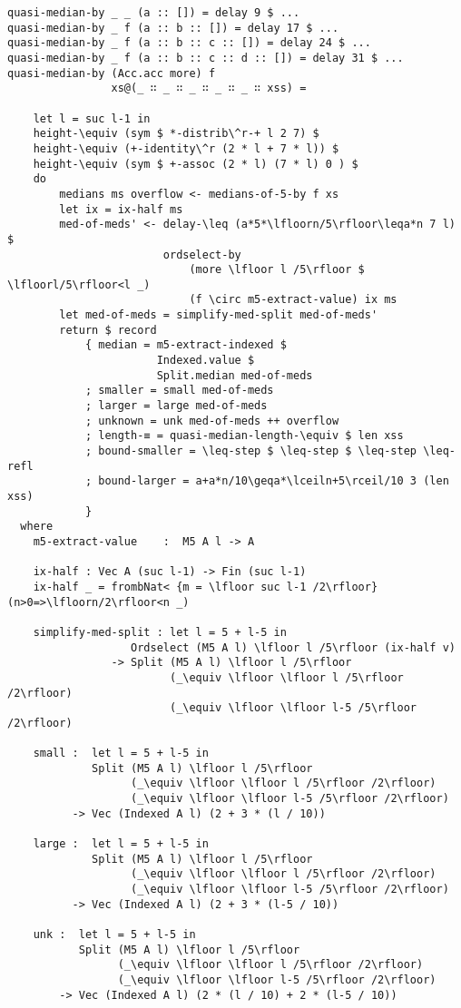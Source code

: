 \begin{lstlisting}[caption={Quasi-Median},label={lst:median:quasimedian}]
quasi-median-by _ _ (a :: []) = delay 9 $ ...
quasi-median-by _ f (a :: b :: []) = delay 17 $ ...
quasi-median-by _ f (a :: b :: c :: []) = delay 24 $ ...
quasi-median-by _ f (a :: b :: c :: d :: []) = delay 31 $ ...
quasi-median-by (Acc.acc more) f
                xs@(_ ∷ _ ∷ _ ∷ _ ∷ _ ∷ xss) =

    let l = suc l-1 in
    height-\equiv (sym $ *-distrib\^r-+ l 2 7) $
    height-\equiv (+-identity\^r (2 * l + 7 * l)) $
    height-\equiv (sym $ +-assoc (2 * l) (7 * l) 0 ) $
    do
        medians ms overflow <- medians-of-5-by f xs
        let ix = ix-half ms
        med-of-meds' <- delay-\leq (a*5*\lfloorn/5\rfloor\leqa*n 7 l) $
                        ordselect-by
                            (more \lfloor l /5\rfloor $ \lfloorl/5\rfloor<l _)
                            (f \circ m5-extract-value) ix ms
        let med-of-meds = simplify-med-split med-of-meds'
        return $ record
            { median = m5-extract-indexed $
                       Indexed.value $
                       Split.median med-of-meds
            ; smaller = small med-of-meds
            ; larger = large med-of-meds
            ; unknown = unk med-of-meds ++ overflow
            ; length-≡ = quasi-median-length-\equiv $ len xss
            ; bound-smaller = \leq-step $ \leq-step $ \leq-step \leq-refl
            ; bound-larger = a+a*n/10\geqa*\lceiln+5\rceil/10 3 (len xss)
            }
  where
    m5-extract-value    :  M5 A l -> A

    ix-half : Vec A (suc l-1) -> Fin (suc l-1)
    ix-half _ = frombNat< {m = \lfloor suc l-1 /2\rfloor} (n>0=>\lfloorn/2\rfloor<n _)

    simplify-med-split : let l = 5 + l-5 in
                   Ordselect (M5 A l) \lfloor l /5\rfloor (ix-half v)
                -> Split (M5 A l) \lfloor l /5\rfloor
                         (_\equiv \lfloor \lfloor l /5\rfloor /2\rfloor)
                         (_\equiv \lfloor \lfloor l-5 /5\rfloor /2\rfloor)

    small :  let l = 5 + l-5 in
             Split (M5 A l) \lfloor l /5\rfloor
                   (_\equiv \lfloor \lfloor l /5\rfloor /2\rfloor)
                   (_\equiv \lfloor \lfloor l-5 /5\rfloor /2\rfloor)
          -> Vec (Indexed A l) (2 + 3 * (l / 10))

    large :  let l = 5 + l-5 in
             Split (M5 A l) \lfloor l /5\rfloor
                   (_\equiv \lfloor \lfloor l /5\rfloor /2\rfloor)
                   (_\equiv \lfloor \lfloor l-5 /5\rfloor /2\rfloor)
          -> Vec (Indexed A l) (2 + 3 * (l-5 / 10))

    unk :  let l = 5 + l-5 in
           Split (M5 A l) \lfloor l /5\rfloor
                 (_\equiv \lfloor \lfloor l /5\rfloor /2\rfloor)
                 (_\equiv \lfloor \lfloor l-5 /5\rfloor /2\rfloor)
        -> Vec (Indexed A l) (2 * (l / 10) + 2 * (l-5 / 10))
\end{lstlisting}

